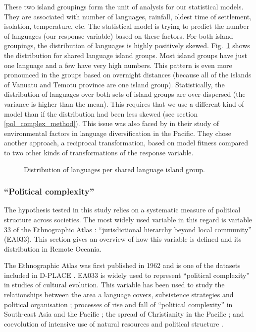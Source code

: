 \documentclass[a4paper,10pt]{article} %
\begin{document}
These two island groupings form the unit of analysis for our statistical models. They are associated with number of languages, rainfall, oldest time of settlement, isolation, temperature, etc. The statistical model is trying to predict the number of languages (our response variable) based on these factors. For both island groupings, the distribution of languages is highly positively skewed. Fig.~\ref{dist_lg_medium} shows the distribution for shared language island groups. Most island groups have just one language and a few have very high numbers. This pattern is even more pronounced in the groups based on overnight distances (because all of the islands of Vanuatu and Temotu province are one island group). Statistically, the distribution of languages over both sets of island groups are over-dispersed (the variance is higher than the mean).
This requires that we use a different kind of model than if the distribution had been less skewed (see section \ref{pol_complex_method}). This issue was also faced by \citet{gavin2012island} in their study of environmental factors in language diversification in the Pacific. They chose another approach, a reciprocal transformation, based on model fitness compared to two other kinds of transformations of the response variable.

\begin{figure}[ht]
\centering
\caption{{Distribution of languages per shared language island group.}}
\label{dist_lg_medium}
\end{figure}

\subsubsection{``Political complexity''}
\label{prediting:sec:pol:complex}
The hypothesis tested in this study relies on a systematic measure of political structure across societies. The most widely used variable in this regard is variable 33 of the Ethnographic Atlas \citep{EA_1971}: ``jurisdictional hierarchy beyond local community'' (EA033). This section gives an overview of how this variable is defined and its distribution in Remote Oceania. 

The Ethnographic Atlas was first published in 1962 and is one of the datasets included in D-PLACE \citep{d_place_all}. EA033 is widely used to represent ``political complexity'' in studies of cultural evolution. This variable has been used to study the relationships between the area a language covers, subsistence strategies and political organisation \citep{curriemace2009}; processes of rise and fall of ``political complexity'' in South-east Asia and the Pacific \citep{currie2010rise}; the spread of Christianity in the Pacific \citep{watts_2018}; and coevolution of intensive use of natural resources and political structure \citep{sheehan2018coevolution}.  
\end{document}
